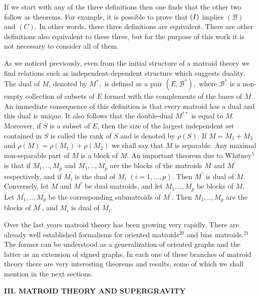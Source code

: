 \documentclass[a4paper,12pt]{article}
\begin{document}
If we start with any of the three definitions then one finds that the other
two follow as theorems. For example, it is possible to prove that $(I\mathit{%
)}$ implies $(\mathcal{B})$ and $(C)$. In other words, these three
definitions are equivalent. There are other definitions also equivalent to
these three, but for the purpose of this work it is not necessary to
consider all of them.

As we noticed previously, even from the initial structure of a matroid
theory we find relations such as independent-dependent structure which
suggests duality. The dual of $M$, denoted by $M^{\ast },$ is defined as a
pair $(E,\mathcal{B}^{\ast }),$ where $\mathcal{B}^{\ast }$ is a non-empty
collection of subsets of $E$ formed with the complements of the bases of $M$%
. An immediate consequence of this definition is that every matroid has a
dual and this dual is unique. It also follows that the double-dual $M^{\ast
\ast }$ is equal to $M$. Moreover, if $S$ is a subset of $E$, then the size
of the largest independent set contained in $S$ is called the rank of $S$
and is denoted by $\rho (S)$. If $M=M_{1}+M_{2}$ and $\rho (M)=\rho
(M_{1})+\rho (M_{2})$ we shall say that $M$ is separable. Any maximal
non-separable part of $M$ is a block of $M$. An important theorem due to
Whitney$^{5}$ is that if $M_{1},..,M_{p}$ and $M_{1}^{^{\prime
}},..,M_{p}^{^{\prime }}$ are the blocks of the matroids $M$ and $M^{\prime
} $ respectively, and if $M_{i}^{^{\prime }}$ is the dual of $M_{i}$ $%
(i=1,...,p)$. Then $M^{\prime }$ is dual of $M$. Conversely, let $M$ and $%
M^{\prime }$ be dual matroids, and let $M_{1},..,M_{p}$ be blocks of $M$.
Let $M_{1}^{^{\prime }},..,M_{p}^{^{\prime }}$ be the corresponding
submatroids of $M^{\prime }$. Then $M_{1}^{^{\prime }},..,M_{p}^{^{\prime }}$
are the blocks of $M^{\prime }$, and $M_{i}^{^{\prime }}$ is dual of $M_{i}.$

Over the last years matroid theory has been growing very rapidly. There are
already well established formalisms for oriented matroids$^{20}$ and bias
matroids.$^{21}$ The former can be understood as a generalization of
oriented graphs and the latter as an extension of signed graphs. In each one
of these branches of matroid theory there are very interesting theorems and
results, some of which we shall mention in the next sections.

\bigskip

\smallskip

\noindent \textbf{III. MATROID THEORY AND SUPERGRAVITY}
\end{document}
